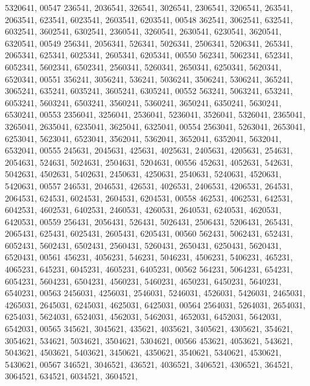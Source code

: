 \begin{DoxyCode}
      5320641,
00547        236541, 2036541,  326541, 3026541, 2306541, 3206541,  263541, 2063541,  623541, 6023541, 2603541, 
      6203541,
00548        362541, 3062541,  632541, 6032541, 3602541, 6302541, 2360541, 3260541, 2630541, 6230541, 3620541, 
      6320541,
00549        256341, 2056341,  526341, 5026341, 2506341, 5206341,  265341, 2065341,  625341, 6025341, 2605341, 
      6205341,
00550        562341, 5062341,  652341, 6052341, 5602341, 6502341, 2560341, 5260341, 2650341, 6250341, 5620341, 
      6520341,
00551        356241, 3056241,  536241, 5036241, 3506241, 5306241,  365241, 3065241,  635241, 6035241, 3605241, 
      6305241,
00552        563241, 5063241,  653241, 6053241, 5603241, 6503241, 3560241, 5360241, 3650241, 6350241, 5630241, 
      6530241,
00553       2356041, 3256041, 2536041, 5236041, 3526041, 5326041, 2365041, 3265041, 2635041, 6235041, 3625041, 
      6325041,
00554       2563041, 5263041, 2653041, 6253041, 5623041, 6523041, 3562041, 5362041, 3652041, 6352041, 5632041, 
      6532041,
00555        245631, 2045631,  425631, 4025631, 2405631, 4205631,  254631, 2054631,  524631, 5024631, 2504631, 
      5204631,
00556        452631, 4052631,  542631, 5042631, 4502631, 5402631, 2450631, 4250631, 2540631, 5240631, 4520631, 
      5420631,
00557        246531, 2046531,  426531, 4026531, 2406531, 4206531,  264531, 2064531,  624531, 6024531, 2604531, 
      6204531,
00558        462531, 4062531,  642531, 6042531, 4602531, 6402531, 2460531, 4260531, 2640531, 6240531, 4620531, 
      6420531,
00559        256431, 2056431,  526431, 5026431, 2506431, 5206431,  265431, 2065431,  625431, 6025431, 2605431, 
      6205431,
00560        562431, 5062431,  652431, 6052431, 5602431, 6502431, 2560431, 5260431, 2650431, 6250431, 5620431, 
      6520431,
00561        456231, 4056231,  546231, 5046231, 4506231, 5406231,  465231, 4065231,  645231, 6045231, 4605231, 
      6405231,
00562        564231, 5064231,  654231, 6054231, 5604231, 6504231, 4560231, 5460231, 4650231, 6450231, 5640231, 
      6540231,
00563       2456031, 4256031, 2546031, 5246031, 4526031, 5426031, 2465031, 4265031, 2645031, 6245031, 4625031, 
      6425031,
00564       2564031, 5264031, 2654031, 6254031, 5624031, 6524031, 4562031, 5462031, 4652031, 6452031, 5642031, 
      6542031,
00565        345621, 3045621,  435621, 4035621, 3405621, 4305621,  354621, 3054621,  534621, 5034621, 3504621, 
      5304621,
00566        453621, 4053621,  543621, 5043621, 4503621, 5403621, 3450621, 4350621, 3540621, 5340621, 4530621, 
      5430621,
00567        346521, 3046521,  436521, 4036521, 3406521, 4306521,  364521, 3064521,  634521, 6034521, 3604521, 

\end{DoxyCode}
